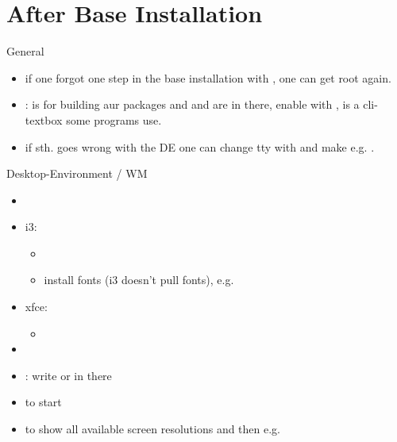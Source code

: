 
\section{After Base Installation}

\begin{frame}[fragile]{General}
  \begin{itemize}
    \item if one forgot one step in the base installation with , one can get root again.
    \item {\tiny{}}:  is for building aur packages and  and  are in there, enable  with ,  is a cli-textbox some programs use.
    \item if sth. goes wrong with the DE one can change tty with  and make e.g. .
  \end{itemize}
\end{frame}

\begin{frame}{Desktop-Environment / WM\vspace{0.5cm}}
  \begin{itemize}
    \item {}
    \item \alert{i3:}
      \begin{itemize}
        \item {}
        \item install fonts (i3 doesn't pull fonts), e.g. 
      \end{itemize}
    \item \alert{xfce:}
      \begin{itemize}
        \item {}
      \end{itemize}
    \item {}
    \item {}: write  or  in there
    \item {} to start
    \item {} to show all available screen resolutions and then e.g. 
  \end{itemize}
\end{frame}


